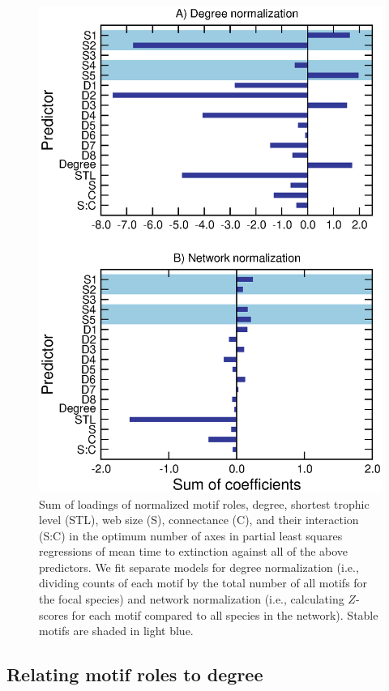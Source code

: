 \documentclass[12pt]{article}
\begin{document}
		\begin{figure}[hb!]
			\caption{Sum of loadings of normalized motif roles, degree, shortest trophic level (STL), web size (S), connectance (C), and their interaction (S:C) in the optimum number of axes in partial least squares regressions of mean time to extinction against all of the above predictors. We fit separate models for degree normalization (i.e., dividing counts of each motif by the total number of all motifs for the focal species) and network normalization (i.e., calculating $Z$-scores for each motif compared to all species in the network). Stable motifs are shaded in light blue.}
			\label{coefficient_sum}
			\includegraphics[height=0.5\textheight]{figures/PLS/total_coefficients.eps}
			\end{figure}


	\subsection*{Relating motif roles to degree}
\end{document}
